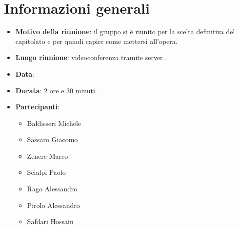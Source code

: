 \section{Informazioni generali}
\begin{itemize}
\item \textbf{Motivo della riunione}: il gruppo si è riunito per la scelta definitiva del capitolato e per quindi capire come mettersi all'opera.
\item \textbf{Luogo riunione}: videoconferenza tramite server .
\item \textbf{Data}: \Data{}
\item \textbf{Durata}: 2 ore e 30 minuti.
\item \textbf{Partecipanti}:
	\begin{itemize}
	\item Baldisseri Michele
	\item Sassaro Giacomo
	\item Zenere Marco
	\item Scialpi Paolo
	\item Rago Alessandro
	\item Pirolo Alessandro
	\item Safdari Hossain
	\end{itemize}
\end{itemize}
\newpage
